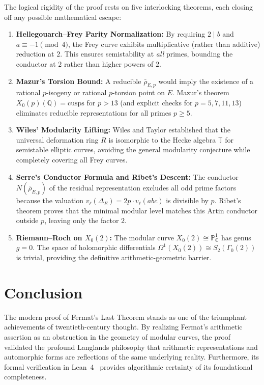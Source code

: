 \documentclass[11pt,a4paper]{article}
\theoremstyle{plain}
\theoremstyle{definition}
\theoremstyle{remark}
\newcommand{\Q}{\mathbb{Q}}
\newcommand{\C}{\mathbb{C}}
\begin{document}
The logical rigidity of the proof rests on five interlocking theorems, each closing off any possible mathematical escape:
\begin{enumerate}
    \item \textbf{Hellegouarch--Frey Parity Normalization:} By requiring $2 \mid b$ and $a \equiv -1 \pmod 4$, the Frey curve exhibits multiplicative (rather than additive) reduction at $2$. This ensures semistability at \emph{all} primes, bounding the conductor at $2$ rather than higher powers of $2$.
    \item \textbf{Mazur's Torsion Bound:} A reducible $\bar{\rho}_{E,p}$ would imply the existence of a rational $p$-isogeny or rational $p$-torsion point on $E$. Mazur's theorem $X_0(p)(\Q) = \text{cusps}$ for $p > 13$ (and explicit checks for $p = 5, 7, 11, 13$) eliminates reducible representations for all primes $p \ge 5$.
    \item \textbf{Wiles' Modularity Lifting:} Wiles and Taylor established that the universal deformation ring $R$ is isomorphic to the Hecke algebra $\mathbb{T}$ for semistable elliptic curves, avoiding the general modularity conjecture while completely covering all Frey curves.
    \item \textbf{Serre's Conductor Formula and Ribet's Descent:} The conductor $N(\bar{\rho}_{E,p})$ of the residual representation excludes all odd prime factors because the valuation $v_\ell(\Delta_E) = 2p \cdot v_\ell(abc)$ is divisible by $p$. Ribet's theorem proves that the minimal modular level matches this Artin conductor outside $p$, leaving only the factor $2$.
    \item \textbf{Riemann--Roch on $X_0(2)$:} The modular curve $X_0(2) \cong \mathbb{P}^1_\C$ has genus $g = 0$. The space of holomorphic differentials $\Omega^1(X_0(2)) \cong S_2(\Gamma_0(2))$ is trivial, providing the definitive arithmetic-geometric barrier.
\end{enumerate}

\section{Conclusion}

The modern proof of Fermat's Last Theorem stands as one of the triumphant achievements of twentieth-century thought. By realizing Fermat's arithmetic assertion as an obstruction in the geometry of modular curves, the proof validated the profound Langlands philosophy that arithmetic representations and automorphic forms are reflections of the same underlying reality. Furthermore, its formal verification in Lean~4~\cite{anthropic2026} provides algorithmic certainty of its foundational completeness.
\end{document}
